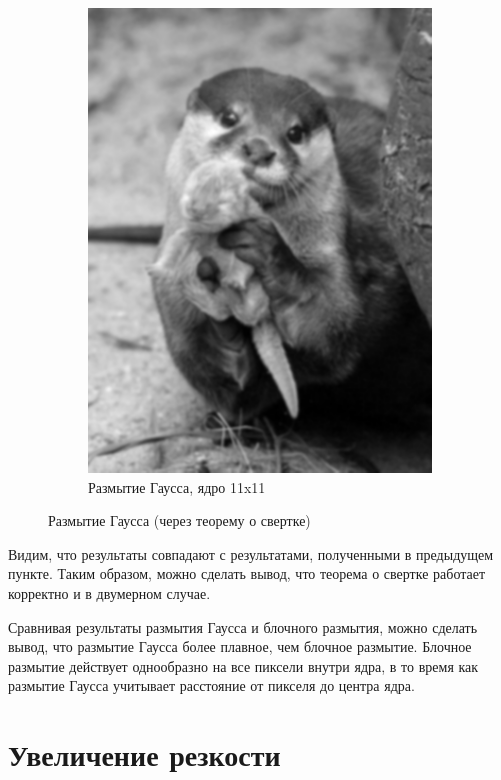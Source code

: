 \begin{figure}[ht!]
\begin{subfigure}[b]{0.5\linewidth}
        \includegraphics[width=0.95\linewidth]{gaussian_11.png}
        \caption{Размытие Гаусса, ядро 11x11}
    \end{subfigure}
    \caption{Размытие Гаусса (через теорему о свертке)}
    \label{img:gauss2}
\end{figure}

Видим, что результаты совпадают с результатами, полученными в предыдущем пункте. Таким образом, можно сделать вывод, 
что теорема о свертке работает корректно и в двумерном случае. 

Сравнивая результаты размытия Гаусса и блочного размытия, можно сделать вывод, что размытие Гаусса более плавное, чем блочное размытие.  Блочное размытие действует однообразно на все пиксели внутри ядра, в то время как размытие Гаусса учитывает расстояние от пикселя до центра ядра. 

\FloatBarrier
\section{Увеличение резкости}

